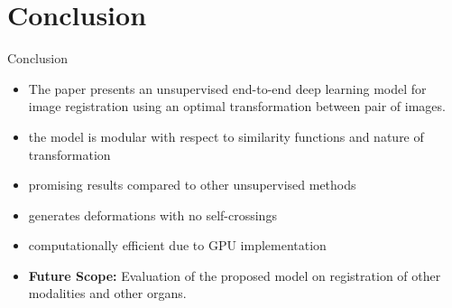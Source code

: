 \documentclass{beamer}
\begin{document}
\section{Conclusion}
	
\begin{frame}{Conclusion}
    \begin{itemize}
        \item The paper presents an unsupervised end-to-end deep learning model for image registration using an optimal transformation between pair of images.
        \item the model is modular with respect to similarity functions and nature of transformation
        \item promising results compared to other unsupervised methods
        \item generates deformations with no self-crossings
        \item computationally efficient due to GPU implementation 
        \item \textbf{Future Scope:} Evaluation of the proposed model on registration of other modalities and other organs.
    \end{itemize}
	
\end{frame}
\end{document}
